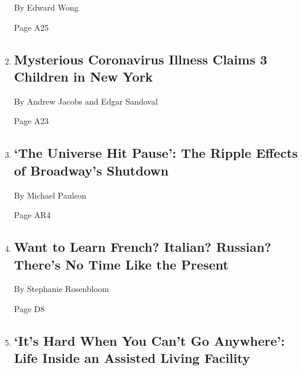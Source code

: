 \begin{enumerate}
  By Edward Wong

  Page A25
\item
  \href{/2020/05/09/health/mysterious-coronavirus-illness-claims-3-children-in-new-york.html}{}

  \hypertarget{mysterious-coronavirus-illness-claims-3-children-in-new-york}{%
  \subsection{Mysterious Coronavirus Illness Claims 3 Children in New
  York}\label{mysterious-coronavirus-illness-claims-3-children-in-new-york}}

  By Andrew Jacobs and Edgar Sandoval

  Page A23
\item
  \href{/2020/05/07/theater/mrs-doubtfire-broadway-shutdown-virus.html}{}

  \hypertarget{the-universe-hit-pause-the-ripple-effects-of-broadways-shutdown}{%
  \subsection{`The Universe Hit Pause': The Ripple Effects of Broadway's
  Shutdown}\label{the-universe-hit-pause-the-ripple-effects-of-broadways-shutdown}}

  By Michael Paulson

  Page AR4
\item
  \href{/2020/04/28/travel/language-instruction-apps-television-youtube.html}{}

  \hypertarget{want-to-learn-french-italian-russian-theres-no-time-like-the-present}{%
  \subsection{Want to Learn French? Italian? Russian? There's No Time
  Like the
  Present}\label{want-to-learn-french-italian-russian-theres-no-time-like-the-present}}

  By Stephanie Rosenbloom

  Page D8
\item
  \href{/interactive/2020/05/09/style/assisted-living-coronavirus.html}{}

  \hypertarget{its-hard-when-you-cant-go-anywhere-life-inside-an-assisted-living-facility}{%
  \subsection{`It's Hard When You Can't Go Anywhere': Life Inside an
  Assisted Living
  Facility}\label{its-hard-when-you-cant-go-anywhere-life-inside-an-assisted-living-facility}}


\end{enumerate}
